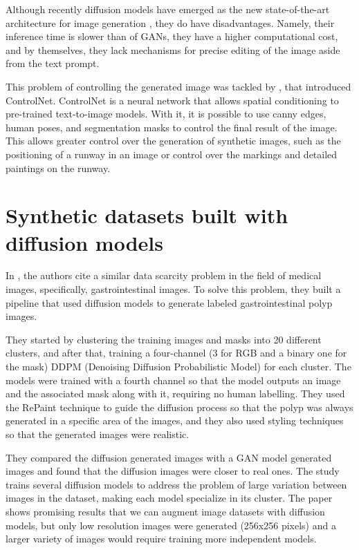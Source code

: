 Although recently diffusion models have emerged as the new state-of-the-art architecture for image generation \cite{yang_diffusion_2024}, they do have disadvantages. Namely, their inference time is slower than of GANs, they have a higher computational cost, and by themselves, they lack mechanisms for precise editing of the image aside from the text prompt.

This problem of controlling the generated image was tackled by \cite{zhang_adding_2023}, that introduced ControlNet. ControlNet is a neural network that allows spatial conditioning to pre-trained text-to-image models. With it, it is possible to use canny edges, human poses, and segmentation masks to control the final result of the image. This allows greater control over the generation of synthetic images, such as the positioning of a runway in an image or control over the markings and detailed paintings on the runway.

\section{Synthetic datasets built with diffusion models}

In \cite{saragih_using_2024}, the authors cite a similar data scarcity problem in the field of medical images, specifically, gastrointestinal images. To solve this problem, they built a pipeline that used diffusion models to generate labeled gastrointestinal polyp images.

They started by clustering the training images and masks into 20 different clusters, and after that, training a four-channel (3 for RGB and a binary one for the mask) DDPM (Denoising Diffusion Probabilistic Model) for each cluster. The models were trained with a fourth channel so that the model outputs an image and the associated mask along with it, requiring no human labelling. They used the RePaint \cite{lugmayr_repaint_2022} technique to guide the diffusion process so that the polyp was always generated in a specific area of the images, and they also used styling techniques so that the generated images were realistic. 

They compared the diffusion generated images with a GAN model generated images
and found that the diffusion images were closer to real ones. The study trains
several diffusion models to address the problem of large variation between
images in the dataset, making each model specialize in its cluster. The paper shows promising results that we can augment image datasets with diffusion models, but only low resolution images were generated (256x256 pixels) and a larger variety of images would require training more independent models.

